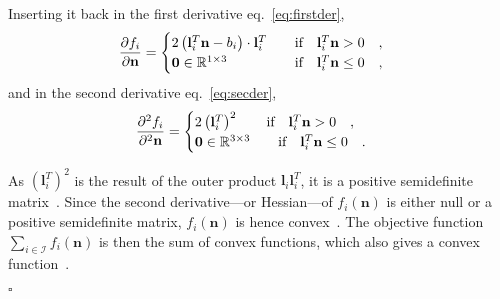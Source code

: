 Inserting it back in the first derivative eq.~\eqref{eq:firstder},
\begin{equation}
\frac{\partial f_i}{\partial {\bf n}} = \begin{cases}
2 \left( \mathbf{l}_i^T \mathbf{n} - b_i \right) \cdot \mathbf{l}_i^T  \qquad\text{if} \quad \mathbf{l}_i^T \mathbf{n} > 0 \quad, \\
\mathbf{0}  \in \mathbb{R}^{1 \times 3} \hfill  \qquad\text{if} \quad \mathbf{l}_i^T \mathbf{n} \leq 0 \quad,
\end{cases} \\
\label{eq:d1ps}
\end{equation}
and in the second derivative eq.~\eqref{eq:secder},
\begin{equation}
\frac{\partial ^2 f_i}{\partial ^2 {\bf n}} = \begin{cases}
2 \left( \mathbf{l}_i^T \right) ^2 \qquad\text{if} \quad \mathbf{l}_i^T \mathbf{n} > 0 \quad, \\
\mathbf{0}  \in \mathbb{R}^{3 \times 3} \hfill  \qquad\text{if} \quad \mathbf{l}_i^T \mathbf{n} \leq 0 \quad.
\end{cases} \\
\label{eq:d2ps}
\end{equation}

As $\left( \mathbf{l}_i^T\right)^2$ is the result of the outer product $\mathbf{l}_i \mathbf{l}_i^T$, it is a positive semidefinite matrix~\cite{schwerdtfeger1950introduction}. Since the second derivative---or Hessian---of $f_i(\mathbf{n})$ is either null or a positive semidefinite matrix, $f_i(\mathbf{n})$ is hence convex~\cite{schwerdtfeger1950introduction}. The objective function $\sum_{i \in \mathcal{I}} f_i(\mathbf{n})$ is then the sum of convex functions, which also gives a convex function~\cite{schwerdtfeger1950introduction}.

\null\hfill$\square$


